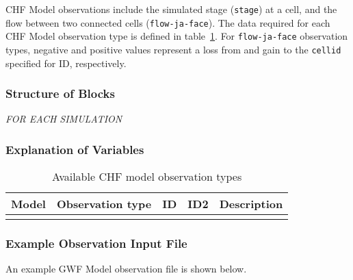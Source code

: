 
CHF Model observations include the simulated stage (\texttt{stage}) at a cell, and the flow between two connected cells (\texttt{flow-ja-face}). The data required for each CHF Model observation type is defined in table~\ref{table:chfobstype}. For \texttt{flow-ja-face} observation types, negative and positive values represent a loss from and gain to the \texttt{cellid} specified for ID, respectively.

\subsubsection{Structure of Blocks}
\vspace{5mm}

\noindent \textit{FOR EACH SIMULATION}



\subsubsection{Explanation of Variables}
\begin{description}

\end{description}


\begin{longtable}{p{2cm} p{2.75cm} p{2cm} p{1.25cm} p{7cm}}
\caption{Available CHF model observation types} \tabularnewline

\hline
\hline
\textbf{Model} & \textbf{Observation type} & \textbf{ID} & \textbf{ID2} & \textbf{Description} \\
\hline
\endhead

\hline
\endfoot


\label{table:chfobstype}
\end{longtable}

\vspace{5mm}
\subsubsection{Example Observation Input File}

An example GWF Model observation file is shown below.



